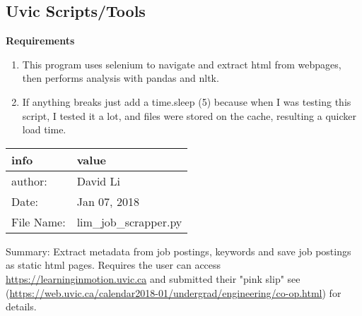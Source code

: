 \subsection{Uvic Scripts/Tools}\label{uvic-scriptstools}

\textbf{Requirements}

\begin{enumerate}
\def\labelenumi{\arabic{enumi}.}
\tightlist
\item
  This program uses selenium to navigate and extract html from webpages,
  then performs analysis with pandas and nltk.
\item
  If anything breaks just add a time.sleep (5) because when I was
  testing this script, I tested it a lot, and files were stored on the
  cache, resulting a quicker load time.
\end{enumerate}

\begin{longtable}[]{@{}ll@{}}
\toprule
\begin{minipage}[b]{0.20\columnwidth}\raggedright
info\strut
\end{minipage} & \begin{minipage}[b]{0.34\columnwidth}\raggedright
value\strut
\end{minipage}\tabularnewline
\midrule
\endhead
\begin{minipage}[t]{0.20\columnwidth}\raggedright
author:\strut
\end{minipage} & \begin{minipage}[t]{0.34\columnwidth}\raggedright
David Li\strut
\end{minipage}\tabularnewline
\begin{minipage}[t]{0.20\columnwidth}\raggedright
Date:\strut
\end{minipage} & \begin{minipage}[t]{0.34\columnwidth}\raggedright
Jan 07, 2018\strut
\end{minipage}\tabularnewline
\begin{minipage}[t]{0.20\columnwidth}\raggedright
File Name:\strut
\end{minipage} & \begin{minipage}[t]{0.34\columnwidth}\raggedright
lim\_job\_scrapper.py\strut
\end{minipage}\tabularnewline
\bottomrule
\end{longtable}

Summary: Extract metadata from job postings, keywords and save job
postings as static html pages. Requires the user can access
\url{https://learninginmotion.uvic.ca} and submitted their "pink slip"
see
(\url{https://web.uvic.ca/calendar2018-01/undergrad/engineering/co-op.html})
for details.

